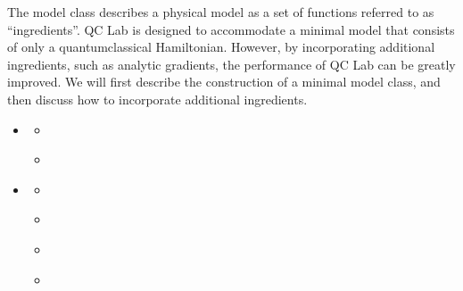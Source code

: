 \documentclass[letterpaper,10pt,english]{sphinxmanual}
\begin{document}
\sphinxAtStartPar
The model class describes a physical model as a set of functions referred to as “ingredients”.
QC Lab is designed to accommodate a minimal model that consists of only a quantum\sphinxhyphen{}classical Hamiltonian.
However, by incorporating additional ingredients, such as analytic gradients, the performance of QC Lab can be greatly improved.
We will first describe the construction of a minimal model class, and then discuss how to incorporate additional ingredients.

\begin{sphinxcontents}
\begin{itemize}
\item {} 
\sphinxAtStartPar
{}\label{\detokenize{user_guide/model_dev:id1}}{\hyperref[\detokenize{user_guide/model_dev:minimal-model-class}]{}}
\begin{itemize}
\item {} 
\sphinxAtStartPar
{}\label{\detokenize{user_guide/model_dev:id2}}{\hyperref[\detokenize{user_guide/model_dev:initialization-functions}]{}}

\item {} 
\sphinxAtStartPar
{}\label{\detokenize{user_guide/model_dev:id3}}{\hyperref[\detokenize{user_guide/model_dev:ingredients}]{}}

\end{itemize}

\item {} 
\sphinxAtStartPar
{}\label{\detokenize{user_guide/model_dev:id4}}{\hyperref[\detokenize{user_guide/model_dev:upgrading-the-model-class}]{}}
\begin{itemize}
\item {} 
\sphinxAtStartPar
{}\label{\detokenize{user_guide/model_dev:id5}}{\hyperref[\detokenize{user_guide/model_dev:vectorized-ingredients}]{}}

\item {} 
\sphinxAtStartPar
{}\label{\detokenize{user_guide/model_dev:id6}}{\hyperref[\detokenize{user_guide/model_dev:analytic-gradients}]{}}

\item {} 
\sphinxAtStartPar
{}\label{\detokenize{user_guide/model_dev:id7}}{\hyperref[\detokenize{user_guide/model_dev:classical-initialization}]{}}

\item {} 
\sphinxAtStartPar
{}\label{\detokenize{user_guide/model_dev:id8}}{\hyperref[\detokenize{user_guide/model_dev:using-built-in-ingredients}]{}}

\end{itemize}

\end{itemize}
\end{sphinxcontents}
\end{document}
